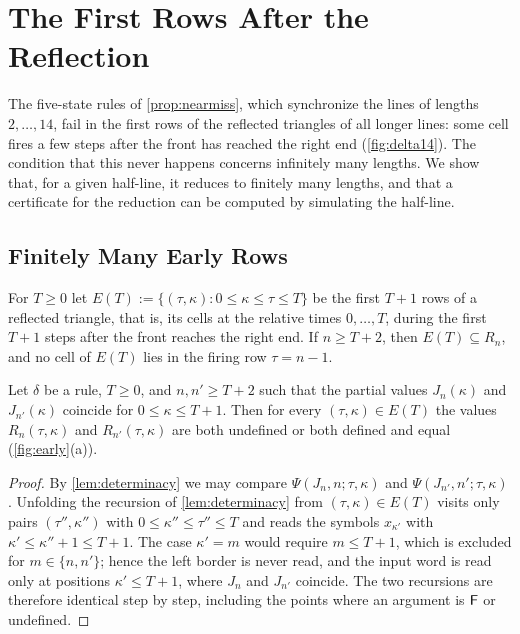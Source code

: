 \section{The First Rows After the Reflection}\label{sec:early}

The five-state rules of \cref{prop:nearmiss}, which synchronize the lines of
lengths $2,\dots,14$, fail in the first rows of the reflected triangles of all
longer lines: some cell fires a few steps after the front has reached the right
end (\cref{fig:delta14}). The condition that this never happens concerns
infinitely many lengths. We show
that, for a given half-line, it reduces to finitely many lengths, and that a
certificate for the reduction can be computed by simulating the half-line.

\subsection{Finitely Many Early Rows}

For $T\ge0$ let $E(T):=\{(\tau,\kappa):0\le\kappa\le\tau\le T\}$ be the first
$T+1$ rows of a reflected triangle, that is, its cells at the relative times
$0,\dots,T$, during the first $T+1$ steps after the front reaches the right
end. If $n\ge T+2$, then $E(T)\subseteq R_n$,
and no cell of $E(T)$ lies in the firing row $\tau=n-1$.

\begin{lemma}\label{lem:early}
Let $\delta$ be a rule, $T\ge0$, and $n,n'\ge T+2$ such that the partial values
$J_n(\kappa)$ and $J_{n'}(\kappa)$ coincide for $0\le\kappa\le T+1$. Then for
every $(\tau,\kappa)\in E(T)$ the values $R_n(\tau,\kappa)$ and
$R_{n'}(\tau,\kappa)$ are both undefined or both defined and equal
(\cref{fig:early}(a)).
\end{lemma}

\begin{proof}
By \cref{lem:determinacy} we may compare $\Psi(J_n,n;\tau,\kappa)$ and
$\Psi(J_{n'},n';\tau,\kappa)$. Unfolding the recursion of
\cref{lem:determinacy} from $(\tau,\kappa)\in E(T)$ visits only pairs
$(\tau'',\kappa'')$ with $0\le\kappa''\le\tau''\le T$ and reads the symbols
$x_{\kappa'}$ with $\kappa'\le\kappa''+1\le T+1$. The case $\kappa'=m$ would
require $m\le T+1$, which is excluded for $m\in\{n,n'\}$; hence the left
border is never read, and the input word is read only at positions
$\kappa'\le T+1$, where $J_n$ and $J_{n'}$ coincide. The two recursions are
therefore identical step by step, including the points where an argument is
$\mathsf F$ or undefined.
\end{proof}

